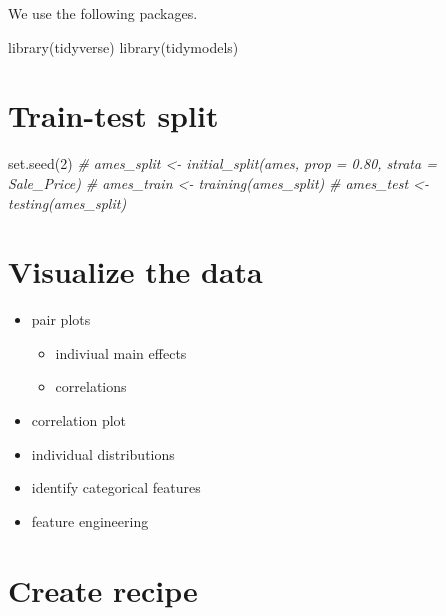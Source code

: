 \documentclass[
]{book}
\newenvironment{Shaded}{\begin{snugshade}}{\end{snugshade}}
\newcommand{\CommentTok}[1]{\textcolor[rgb]{0.56,0.35,0.01}{\textit{#1}}}
\newcommand{\DecValTok}[1]{\textcolor[rgb]{0.00,0.00,0.81}{#1}}
\newcommand{\FunctionTok}[1]{\textcolor[rgb]{0.00,0.00,0.00}{#1}}
\newcommand{\NormalTok}[1]{#1}
\begin{document}
We use the following packages.\citep{tidyverse, tidymodels}

\begin{Shaded}
\begin{Highlighting}[]
\FunctionTok{library}\NormalTok{(tidyverse)}
\FunctionTok{library}\NormalTok{(tidymodels)}
\end{Highlighting}
\end{Shaded}

\hypertarget{train-test-split}{%
\section{Train-test split}\label{train-test-split}}

\begin{Shaded}
\begin{Highlighting}[]
\FunctionTok{set.seed}\NormalTok{(}\DecValTok{2}\NormalTok{)}
\CommentTok{\# ames\_split \textless{}{-} initial\_split(ames, prop = 0.80, strata = Sale\_Price)}
\CommentTok{\# ames\_train \textless{}{-} training(ames\_split)}
\CommentTok{\# ames\_test  \textless{}{-}  testing(ames\_split)}
\end{Highlighting}
\end{Shaded}

\hypertarget{visualize-the-data}{%
\section{Visualize the data}\label{visualize-the-data}}

\begin{itemize}
\item
  pair plots

  \begin{itemize}
  \item
    indiviual main effects
  \item
    correlations
  \end{itemize}
\item
  correlation plot
\item
  individual distributions
\item
  identify categorical features
\item
  feature engineering
\end{itemize}

\hypertarget{create-recipe}{%
\section{Create recipe}\label{create-recipe}}
\end{document}
